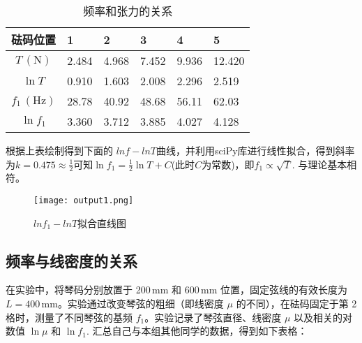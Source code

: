 \documentclass[UTF-8,twoside,cs4size]{ctexart}
\begin{document}
\begin{table}[!h]
    \centering
    \renewcommand\arraystretch{1.5}
    \caption{频率和张力的关系}
    \begin{tabularx}{\textwidth}{|c|Y|Y|Y|Y|Y|}
        \hline
        \textbf{砝码位置} & \textbf{1} & \textbf{2} & \textbf{3} & \textbf{4} & \textbf{5} \\
        \hline
        $T\,(\mathrm{N})$ & 2.484 & 4.968 & 7.452 & 9.936 & 12.420 \\
        \hline
        $\ln T$ & 0.910 & 1.603 & 2.008 & 2.296 & 2.519 \\
        \hline
        $f_1\,(\mathrm{Hz})$ & 28.78 & 40.92 & 48.68 & 56.11 & 62.03 \\
        \hline
        $\ln f_1$ & 3.360 & 3.712 & 3.885 & 4.027 &  4.128 \\
        \hline
    \end{tabularx}
\end{table}
根据上表绘制得到下面的
$lnf - lnT$曲线，并利用sciPy库进行线性拟合，得到斜率为$k = 0.475\approx\frac12 $可知$ \ln f_1=\frac 12\ln T+C $(此时$ C $为常数)，即$ f_1\propto\sqrt{T} $.
与理论基本相符。
\begin{figure}[!h]
    \centering
    \texttt{[image: output1.png]}
    \caption{$lnf_1 - lnT$拟合直线图}
\end{figure}
\newpage

\subsection{频率与线密度的关系}
在实验中，将琴码分别放置于 200\,mm 和 600\,mm 位置，固定弦线的有效长度为 $L=400\,\mathrm{mm}$。实验通过改变琴弦的粗细（即线密度 $\mu$ 的不同），在砝码固定于第 2 格时，测量了不同琴弦的基频 $f_1$。实验记录了琴弦直径、线密度 $\mu$ 以及相关的对数值 $\ln \mu$ 和 $\ln f_1$.
汇总自己与本组其他同学的数据，得到如下表格：
\end{document}
